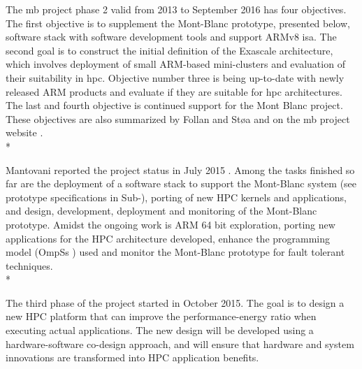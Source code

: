 The \gls{mb} project phase 2 valid from 2013 to September 2016 has four objectives. The first objective is to supplement the Mont-Blanc prototype, presented below, software stack with software development tools and support ARMv8 \gls{isa}. The second goal is to construct the initial definition of the Exascale architecture, which involves deployment of small ARM-based mini-clusters and evaluation of their suitability in \gls{hpc}. Objective number three is being up-to-date with newly released ARM products and evaluate if they are suitable for \gls{hpc} architectures. The last and fourth objective is continued support for the Mont Blanc project. These objectives are also summarized by Follan and Støa \cite{mt:T&S} and on the \gls{mb} project website \cite{MB}.\\*

Mantovani reported the project status in July 2015 \cite{p:MB-15}. Among the tasks finished so far are the deployment of a software stack to support the Mont-Blanc system (see prototype specifications in Sub-), porting of new HPC kernels and applications, and design, development, deployment and monitoring of the Mont-Blanc prototype. Amidst the ongoing work is ARM 64 bit exploration, porting new applications for the HPC architecture developed, enhance the programming model (OmpSs \cite{OMPSS}) used and monitor the Mont-Blanc prototype for fault tolerant techniques. \\*

The third phase of the project started in October 2015. The goal is to design a new HPC platform that can improve the performance-energy ratio when executing actual applications. The new design will be developed using a hardware-software co-design \cite{a:MG1997} approach, and will ensure that hardware and system innovations are transformed into HPC application benefits.

